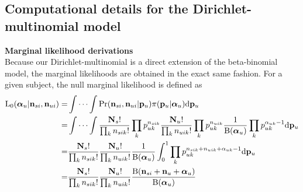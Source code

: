 \documentclass{article}
\begin{document}
\subsection{Computational details for the Dirichlet-multinomial model}
\noindent\textbf{Marginal likelihood derivations}\\
Because our Dirichlet-multinomial is a direct extension of the beta-binomial model, the marginal likelihoods are obtained in the exact same fashion. 
For a given subject, the null marginal likelihood is defined as
\[
\begin{split}
\mathrm{L_0}(\boldsymbol{\alpha}_u|\mathbf{n}_{si},\mathbf{n}_{ui})=&\idotsint\mathrm{Pr}(\mathbf{n}_{si},\mathbf{n}_{ui}|\mathbf{p}_u)\pi(\mathbf{p}_u|\boldsymbol{\alpha}_u)\mathrm{d}\mathbf{p}_u\\
=&\idotsint \frac{\mathbf{N}_s!}{\prod_k {n}_{sik}!}\prod_k p^{n_{sik}}_{uk} \frac{\mathbf{N}_u!}{\prod_k {n}_{uik}!}\prod_k p^{n_{uik}}_{uk}\frac{1}{\mathrm{B}(\boldsymbol{\alpha}_u)}\prod_k p_{uk}^{\alpha_{uk}-1}\mathrm{d}\mathbf{p}_u\\
=&\frac{\mathbf{N}_s!}{\prod_k {n}_{sik}!}\frac{\mathbf{N}_u!}{\prod_k {n}_{uik}!}\frac{1}{\mathrm{B}(\boldsymbol{\alpha}_u)}\int_0^1 \prod_k p^{n_{sik}+n_{uik}+\alpha_{uk}-1}_{uk}\mathrm{d}\mathbf{p}_u\\
=&\frac{\mathbf{N}_s!}{\prod_k {n}_{sik}!}\frac{\mathbf{N}_u!}{\prod_k {n}_{uik}!}\frac{\mathrm{B}(\mathbf{n}_{si}+\mathbf{n}_u+\boldsymbol{\alpha}_u)}{\mathrm{B}(\boldsymbol{\alpha}_u)}
\end{split}
\]
\end{document}
